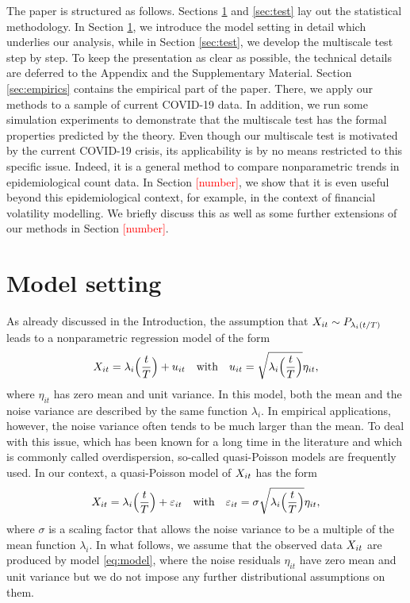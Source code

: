 \documentclass[a4paper,12pt]{article}
\numberwithin{equation}{section}
\begin{document}
The paper is structured as follows. Sections \ref{sec:model} and \ref{sec:test} lay out the statistical methodology. In Section \ref{sec:model}, we introduce the model setting in detail which underlies our analysis, while in Section \ref{sec:test}, we develop the multiscale test step by step. To keep the presentation as clear as possible, the technical details are deferred to the Appendix and the Supplementary Material. Section \ref{sec:empirics} contains the empirical part of the paper. There, we apply our methods to a sample of current COVID-19 data. In addition, we run some simulation experiments to demonstrate that the multiscale test has the formal properties predicted by the theory. Even though our multiscale test is motivated by the current COVID-19 crisis, its applicability is by no means restricted to this specific issue. Indeed, it is a general method to compare nonparametric trends in epidemiological count data. In Section \textcolor{red}{[number]}, we show that it is even useful beyond this epidemiological context, for example, in the context of financial volatility modelling. We briefly discuss this as well as some further extensions of our methods in Section \textcolor{red}{[number]}.



\section{Model setting}\label{sec:model}


As already discussed in the Introduction, the assumption that $X_{it} \sim P_{\lambda_i(t/T)}$ leads to a nonparametric regression model of the form 
\begin{equation}\label{eq:model-Poisson}
X_{it} = \lambda_i\Big(\frac{t}{T}\Big) + u_{it} \quad \text{with} \quad u_{it} = \sqrt{\lambda_i\Big(\frac{t}{T}\Big)} \eta_{it}, 
\end{equation}
where $\eta_{it}$ has zero mean and unit variance. In this model, both the mean and the noise variance are described by the same function $\lambda_i$. In empirical applications, however, the noise variance often tends to be much larger than the mean. To deal with this issue, which has been known for a long time in the literature \citep{Cox1983} and which is commonly called overdispersion, so-called quasi-Poisson models \citep{McCullagh1989, Efron1986} are frequently used. In our context, a quasi-Poisson model of $X_{it}$ has the form 
\begin{equation}\label{eq:model}
X_{it} = \lambda_i\Big(\frac{t}{T}\Big) + \varepsilon_{it} \quad \text{with} \quad \varepsilon_{it} = \sigma \sqrt{\lambda_i\Big(\frac{t}{T}\Big)} \eta_{it}, 
\end{equation}
where $\sigma$ is a scaling factor that allows the noise variance to be a multiple of the mean function $\lambda_i$. In what follows, we assume that the observed data $X_{it}$ are produced by model \eqref{eq:model}, where the noise residuals $\eta_{it}$ have zero mean and unit variance but we do not impose any further distributional assumptions on them. 
\end{document}
